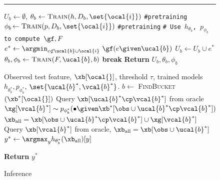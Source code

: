 \documentclass[letterpaper]{article}
\begin{document}

 \begin{figure}[t]
\vspace{-9mm}
 \begin{minipage}{0.46\textwidth}
\hrule
\small
\begin{algorithmic}[1]
    \STATE $U_b \leftarrow \emptyset$, 
    \STATE $\theta_b  \gets \textsc{Train}(h, D_b,\set{\ocal{i}})$  \texttt{\small \#pretraining}
      \STATE $\phi_b \hspace{-0.5mm} \gets \textsc{Train}(p, D_b,\set{\ocal{i}})$ \texttt{\small\#pretraining}
          \STATE   \texttt{\small \# Use $h_{\theta _b }$, $p_{\phi _b}  $ to compute $\gf,F$ }
             \STATE $e^* \gets {\argmin}_{e\not\in \ucal{b}\cup \ocal{i}}\ \gf(e\given \ucal{b}) $
             \STATE $U_b \gets U_b \cup e^*$ 
              \STATE $\theta _b , \phi _b  \gets \textsc{Train}(F,\ucal{b},b)$
              \ELSE
              \STATE \textbf{break}
              \ENDIF
         \ENDFOR
        \STATE \textbf{Return} $U_b, \theta _b , \phi _b $
    \ENDFUNCTION
        \end{algorithmic}
\begin{algorithm}[H]
\small
\caption{Inference}
\begin{algorithmic}[1]
    \REQUIRE Observed test feature, $\xb[\ocal{}]$, threshold $\tau$, trained models $h_{\theta^* _b}, p_{\phi^*_b}$, $\set{\ucal{b} ^*,\vcal{b}^*}$.
    \STATE $b \leftarrow$ \textsc{FindBucket}$(\xb^*[\ocal{}])$
    \STATE Query $\xb[\ucal{b}^*\cp \vcal{b}^*]$ from oracle
    \STATE $\xg[\vcal{b}^*]\sim p_{\phi^* _b}(\bullet \given \xb^*[\obs\cup  \ucal{b}^* \cp \vcal{b}^*])$ 
    \STATE $\xb_{\text{all}}  = \xb[\obs\cup  \ucal{b} ^*\cp \vcal{b}^*]\cup \xg[\vcal{b}^*]$
        \STATE Query $\xb[\vcal{b}^*]$ from oracle,
        $\xb_{\text{all}}  = \xb[\obs\cup  \ucal{b}^*]$
    \ENDIF
         \STATE $y^* \leftarrow \argmax_{y} h_{\theta^* _b }(\xb_{\text{all}})[y]$ 

    \STATE \textbf{Return} $y^*$
\end{algorithmic}
\label{alg:inference}
\end{algorithm}
\end{minipage}
\end{figure}
\end{document}
